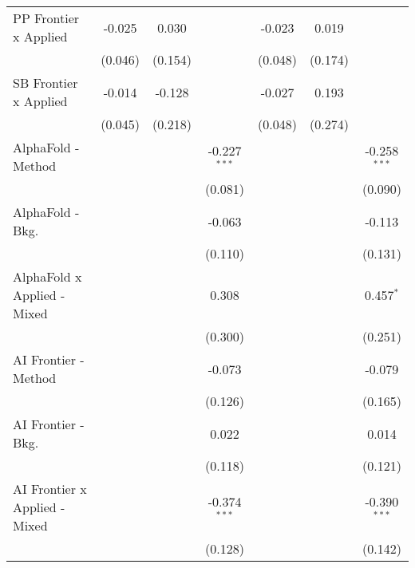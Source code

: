 \begin{tabular}{lcccccc}
   PP Frontier x Applied          & -0.025         & 0.030        &                & -0.023         & 0.019       &   \\   
                                  & (0.046)        & (0.154)      &                & (0.048)        & (0.174)     &   \\   
   SB Frontier x Applied          & -0.014         & -0.128       &                & -0.027         & 0.193       &   \\   
                                  & (0.045)        & (0.218)      &                & (0.048)        & (0.274)     &   \\   
   AlphaFold - Method             &                &              & -0.227$^{***}$ &                &             & -0.258$^{***}$\\   
                                  &                &              & (0.081)        &                &             & (0.090)\\   
   AlphaFold - Bkg.               &                &              & -0.063         &                &             & -0.113\\   
                                  &                &              & (0.110)        &                &             & (0.131)\\   
   AlphaFold x Applied - Mixed    &                &              & 0.308          &                &             & 0.457$^{*}$\\   
                                  &                &              & (0.300)        &                &             & (0.251)\\   
   AI Frontier - Method           &                &              & -0.073         &                &             & -0.079\\   
                                  &                &              & (0.126)        &                &             & (0.165)\\   
   AI Frontier - Bkg.             &                &              & 0.022          &                &             & 0.014\\   
                                  &                &              & (0.118)        &                &             & (0.121)\\   
   AI Frontier x Applied - Mixed  &                &              & -0.374$^{***}$ &                &             & -0.390$^{***}$\\   
                                  &                &              & (0.128)        &                &             & (0.142)\\   

\end{tabular}
